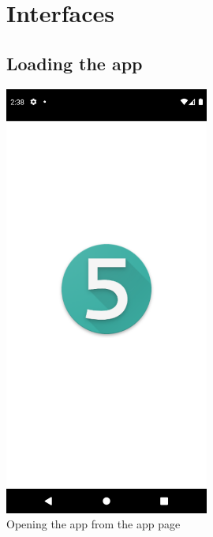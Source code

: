 \documentclass[12pt]{article}
\begin{document}
\begin{figure}[b!]
\vspace{-2cm}
\section{Interfaces}
\subsection*{Loading the app}
\centerline{\includegraphics[width=0.6\textwidth]{./Screenshots/20.PNG}}
  \caption{Opening the app from the app page}
\end{figure}
\end{document}

